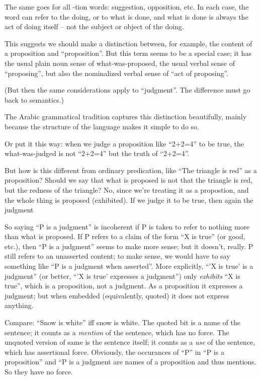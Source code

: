 \documentclass[12pt,toc]{tufte-handout}
\theoremstyle{plain}
\begin{document}
The same goes for all -tion words: suggestion, opposition, etc.  In
each case, the word can refer to the doing, or to what is done, and
what is done is always the act of doing itself -- not the subject or
object of the doing.

This suggests we should make a distinction between, for example, the
content of a proposition and ``proposition''.  But this term seems to
be a special case; it has the usual plain noun sense of
what-was-proposed, the usual verbal sense of ``proposing'', but also
the nominalized verbal sense of ``act of proposing''.

(But then the same considerations apply to ``judgment''.  The
difference must go back to semantics.)

\begin{remark}
  The Arabic grammatical tradition captures this distinction
  beautifully, mainly because the structure of the language makes it
  simple to do so.
\end{remark}

Or put it this way: when we judge a proposition like ``2+2=4'' to be
true, the what-was-judged is not ``2+2=4'' but the truth of ``2+2=4''.

\begin{remark}
  But how is this different from ordinary predication, like ``The
  triangle is red'' as a proposition?  Should we say that what is
  proposed is not that the triangle is red, but the redness of the
  triangle?  No, since we're treating it as a propostion, and the
  whole thing is proposed (exhibited).  If we judge it to be true,
  then again the judgment 
\end{remark}

So saying ``P is a judgment'' is incoherent if P is taken to refer to
nothing more than what is proposed.  If P refers to a claim of the
form ``X is true'' (or good, etc.), then ``P is a judgment'' seems to
make more sense; but it doesn't, really.  P still refers to an
unasserted content; to make sense, we would have to say something like
``P is a judgment when asserted''.  More explicitly, ``'X is true' is
a judgment'' (or better, ``'X is true' expresses a judgment'') only
\textit{exhibits} ``X is true'', which is a proposition, not a
judgment.  As a proposition it expresses a judgment; but when embedded
(equivalently, quoted) it does not express anything.

\begin{remark}
  Compare: ``Snow is white'' iff snow is white.  The quoted bit is a
  name of the sentence; it counts as a \textit{mention} of the
  sentence, which has no force.  The unquoted version of same is the
  sentence itself; it counts as a \textit{use} of the sentence, which
  has assertional force.  Obviously, the occurances of ``P'' in ``P is
  a proposition'' and ``P is a judgment are names of a proposition and
  thus mentions.  So they have no force.
\end{remark}
\end{document}
